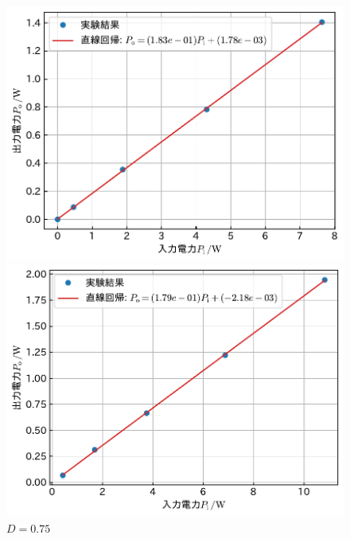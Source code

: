 \documentclass[1_power_supply.tex]{subfiles}
\begin{document}
\begin{figure}[htbp]
      \vspace{1.5mm}
      \begin{minipage}{0.45\columnwidth}
        \centering
        \includegraphics[width=0.8\columnwidth]{2_60p.pdf}
        \caption{$D=0.6$}\label{fig:2_60p}
      \end{minipage}
      \begin{minipage}{0.45\columnwidth}
        \centering
        \includegraphics[width=0.8\columnwidth]{2_75p.pdf}
        \caption{$D=0.75$}\label{fig:2_75p}
      \end{minipage}


\end{figure}
\end{document}
